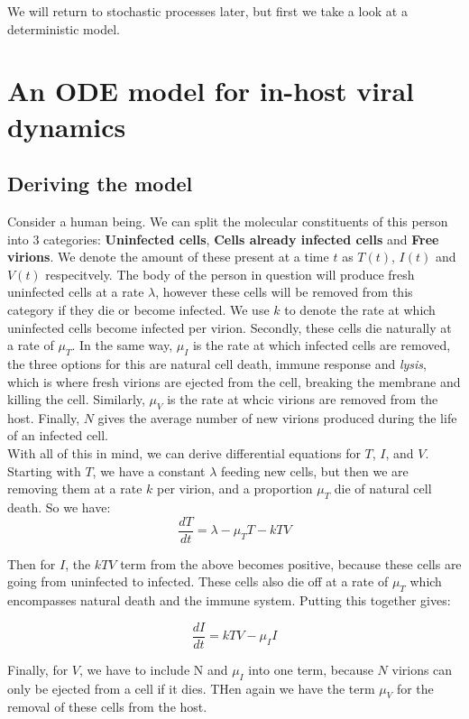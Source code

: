 We will return to stochastic processes later, but first we take a look at a deterministic model.

\section{An ODE model for in-host viral dynamics}

\subsection{Deriving the model}

Consider a human being. We can split the molecular constituents of this person into 3 categories: \textbf{Uninfected cells}, \textbf{Cells already infected cells} and \textbf{Free virions}. We denote the amount of these present at a time $t$ as  $T(t)$,  $I(t)$ and  $V(t)$ respecitvely.
The body of the person in question will produce fresh uninfected cells at a rate $\lambda$, however these cells will be removed from this category if they die or become infected. We use  $k$ to denote the rate at which uninfected cells become infected per virion. Secondly, these cells die naturally at a rate of  $\mu_T$. In the same way, $\mu_I$ is the rate at which infected cells are removed, the three options for this are natural cell death, immune response and \textit{lysis}, which is where fresh virions are ejected from the cell, breaking the membrane and killing the cell. Similarly, $\mu_V$ is the rate at whcic virions are removed from the host. Finally, $N$ gives the average number of new virions produced during the life of an infected cell. \\

With all of this in mind, we can derive differential equations for $T$,  $I$, and  $V$. Starting with $T$, we have a constant  $\lambda$ feeding new cells, but then we are removing them at a rate $k$ per virion, and a proportion $\mu_T$ die of natural cell death. So we have: \\

\[
    \frac{dT}{dt} = \lambda - \mu_TT - kTV    
\] 

Then for $I$, the $kTV$ term from the above becomes positive, because these cells are going from uninfected to infected. These cells also die off at a rate of $\mu_T$ which encompasses natural death and the immune system. Putting this together gives:

\[
    \frac{dI}{dt} = kTV - \mu_II    
\] 

Finally, for $V$, we have to include N and $\mu_I$ into one term, because  $N$ virions can only be ejected from a cell if it dies. THen again we have the term  $\mu_V$ for the removal of these cells from the host.


